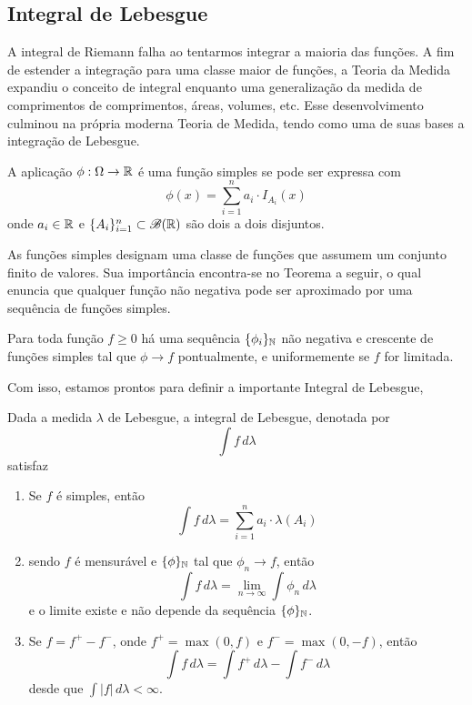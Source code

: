 \subsection{Integral de Lebesgue}

A integral de Riemann falha ao tentarmos integrar a maioria das funções.
A fim de estender a integração para uma classe maior de funções, a Teoria da Medida
expandiu o conceito de integral enquanto uma generalização da medida de comprimentos
de comprimentos, áreas, volumes, etc.
Esse desenvolvimento culminou na própria moderna Teoria de Medida, tendo como uma de
suas bases a integração de Lebesgue.

\begin{def:funcao simples}
A aplicação $\phi: \Omega \to \mathbb{R}$ é uma função simples se pode ser expressa
com
\[
	\phi(x) = \sum_{i=1}^n a_i \cdot I_{A_i}(x)
\]
onde $a_i \in \mathbb{R}$ e $\{A_i\}_{i=1}^n \subset \mathcal{B}(\mathbb{R})$ são dois a dois disjuntos.
\end{def:funcao simples}

As funções simples designam uma classe de funções que assumem um conjunto finito de valores.
Sua importância encontra-se no Teorema a seguir, o qual enuncia que qualquer função
não negativa pode ser aproximado por uma sequência de funções simples.

\begin{thm:aproximacao monotona}
Para toda função $f \ge 0$ há uma sequência $\{\phi_i\}_{\mathbb{N}}$ não negativa e crescente de
funções simples tal que $\phi \to f$ pontualmente, e uniformemente se $f$ for limitada.
\end{thm:aproximacao monotona}

Com isso, estamos prontos para definir a importante Integral de Lebesgue,

\begin{def:integral de lebesgue}
Dada a medida $\lambda$ de Lebesgue, a integral de Lebesgue, denotada por
\[
	\int f\, d\lambda
\]
satisfaz
\begin{enumerate}
	\item[i.] Se $f$ é simples, então
	      \[
		      \int f\, d\lambda = \sum_{i=1}^n a_i \cdot \lambda(A_i)
	      \]
	\item[ii.] sendo $f$ é mensurável e $\{\phi\}_{\mathbb{N}}$ tal que $\phi_n \to f$, então
	      \[
		      \int f\, d\lambda = \lim_{n \to \infty} \int \phi_n\, d\lambda
	      \]
	      e o limite existe e não depende da sequência $\{\phi\}_{\mathbb{N}}$.
	\item[iii.] Se $f = f^+ - f^-$, onde $f^+ = \max(0, f)$ e $f^- = \max(0, -f)$, então
	      \[
		      \int f\, d\lambda = \int f^+\, d\lambda - \int f^-\, d\lambda
	      \]
	      desde que $\int |f|\, d\lambda < \infty$.
\end{enumerate}
\end{def:integral de lebesgue}

